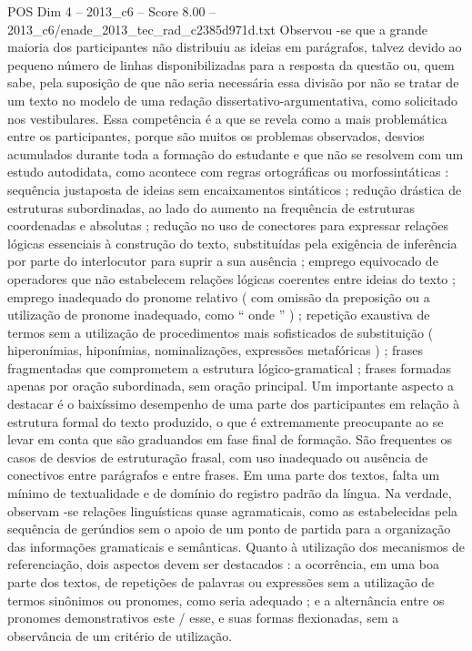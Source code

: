 \begin{textsample}{POS Dim 4 – 2013\_c6 – Score 8.00 – 2013\_c6/enade\_2013\_tec\_rad\_c2385d971d.txt}
Observou -se que a grande maioria dos participantes não distribuiu as ideias em parágrafos, talvez devido ao pequeno número de linhas disponibilizadas para a resposta da questão ou, quem sabe, pela suposição de que não seria necessária essa divisão por não se tratar de um texto no modelo de uma redação dissertativo-argumentativa, como solicitado nos vestibulares.
Essa competência é a que se revela como a mais problemática entre os participantes, porque são muitos os problemas observados, desvios acumulados durante toda a formação do estudante e que não se resolvem com um estudo autodidata, como acontece com regras ortográficas ou morfossintáticas : sequência justaposta de ideias sem encaixamentos sintáticos ; redução drástica de estruturas subordinadas, ao lado do aumento na frequência de estruturas coordenadas e absolutas ; redução no uso de conectores para expressar relações lógicas essenciais à construção do texto, substituídas pela exigência de inferência por parte do interlocutor para suprir a sua ausência ; emprego equivocado de operadores que não estabelecem relações lógicas coerentes entre ideias do texto ; emprego inadequado do pronome relativo ( com omissão da preposição ou a utilização de pronome inadequado, como “ onde ” ) ; repetição exaustiva de termos sem a utilização de procedimentos mais sofisticados de substituição ( hiperonímias, hiponímias, nominalizações, expressões metafóricas ) ; frases fragmentadas que comprometem a estrutura lógico-gramatical ; frases formadas apenas por oração subordinada, sem oração principal.
Um importante aspecto a destacar é o baixíssimo desempenho de uma parte dos participantes em relação à estrutura formal do texto produzido, o que é extremamente preocupante ao se levar em conta que são graduandos em fase final de formação.
São frequentes os casos de desvios de estruturação frasal, com uso inadequado ou ausência de conectivos entre parágrafos e entre frases.
Em uma parte dos textos, falta um mínimo de textualidade e de domínio do registro padrão da língua.
Na verdade, observam -se relações linguísticas quase agramaticais, como as estabelecidas pela sequência de gerúndios sem o apoio de um ponto de partida para a organização das informações gramaticais e semânticas.
Quanto à utilização dos mecanismos de referenciação, dois aspectos devem ser destacados : a ocorrência, em uma boa parte dos textos, de repetições de palavras ou expressões sem a utilização de termos sinônimos ou pronomes, como seria adequado ; e a alternância entre os pronomes demonstrativos este / esse, e suas formas flexionadas, sem a observância de um critério de utilização.

\end{textsample}
